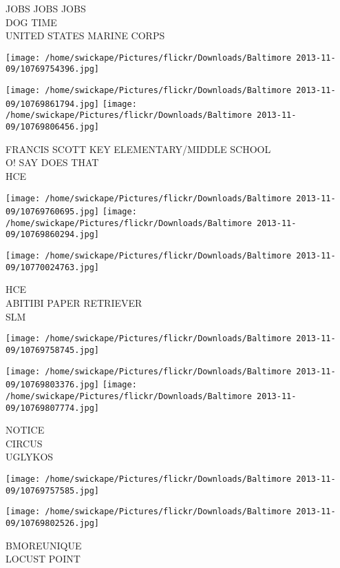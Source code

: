 \documentclass[10pt,letterpaper]{article}
\begin{document}
JOBS JOBS JOBS\\
DOG TIME\\
UNITED STATES MARINE CORPS
\pagebreak

\texttt{[image: /home/swickape/Pictures/flickr/Downloads/Baltimore 2013-11-09/10769754396.jpg]}

\vspace{0.25in}
\texttt{[image: /home/swickape/Pictures/flickr/Downloads/Baltimore 2013-11-09/10769861794.jpg]}
\texttt{[image: /home/swickape/Pictures/flickr/Downloads/Baltimore 2013-11-09/10769806456.jpg]}

FRANCIS SCOTT KEY ELEMENTARY/MIDDLE SCHOOL\\
O! SAY DOES THAT\\
HCE
\pagebreak

\texttt{[image: /home/swickape/Pictures/flickr/Downloads/Baltimore 2013-11-09/10769760695.jpg]}
\texttt{[image: /home/swickape/Pictures/flickr/Downloads/Baltimore 2013-11-09/10769860294.jpg]}

\vspace{0.25in}
\texttt{[image: /home/swickape/Pictures/flickr/Downloads/Baltimore 2013-11-09/10770024763.jpg]}

HCE\\
ABITIBI PAPER RETRIEVER\\
SLM
\pagebreak

\texttt{[image: /home/swickape/Pictures/flickr/Downloads/Baltimore 2013-11-09/10769758745.jpg]}

\vspace{0.25in}
\texttt{[image: /home/swickape/Pictures/flickr/Downloads/Baltimore 2013-11-09/10769803376.jpg]}
\texttt{[image: /home/swickape/Pictures/flickr/Downloads/Baltimore 2013-11-09/10769807774.jpg]}

NOTICE\\
CIRCUS\\
UGLYKOS
\pagebreak

\texttt{[image: /home/swickape/Pictures/flickr/Downloads/Baltimore 2013-11-09/10769757585.jpg]}

\vspace{0.25in}
\texttt{[image: /home/swickape/Pictures/flickr/Downloads/Baltimore 2013-11-09/10769802526.jpg]}

BMOREUNIQUE\\
LOCUST POINT
\pagebreak
\end{document}
